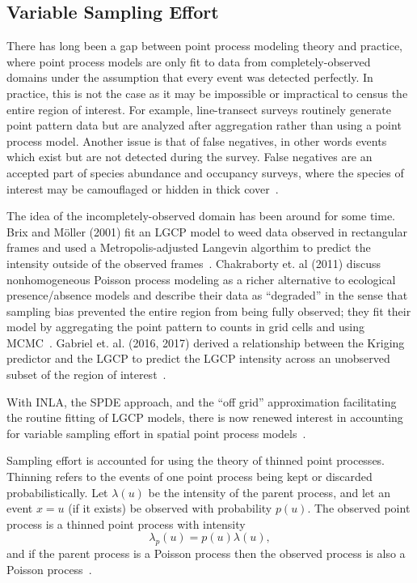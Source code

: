 \documentclass[]{interact}
\begin{document}
\subsection{Variable Sampling Effort}
\label{veffort}

There has long been a gap between point process modeling theory and practice,
where point process models are only fit to data from completely-observed
domains under the assumption that every event was detected perfectly. In
practice, this is not the case as it may be impossible or impractical to census
the entire region of interest. For example, line-transect surveys routinely
generate point pattern data but are analyzed after aggregation rather than
using a point process model. Another issue is that of false negatives, in other
words events which exist but are not detected during the survey. False
negatives are an accepted part of species abundance and occupancy surveys,
where the species of interest may be camouflaged or hidden in thick
cover~\cite{linkbarker,bucklandetal,mackenzieetal}.

The idea of the incompletely-observed domain has been around for some time.
Brix and M\"{o}ller (2001) fit an LGCP model to weed data observed in
rectangular frames and used a Metropolis-adjusted Langevin algorthim
to predict the intensity outside of the observed frames~\cite{brixmoeller}.
Chakraborty et. al (2011) discuss nonhomogeneous Poisson process modeling as
a richer alternative to ecological presence/absence models and describe their
data as ``degraded'' in the sense that sampling bias prevented the entire
region from being fully observed; they fit their model by aggregating the
point pattern to counts in grid cells and using MCMC~\cite{chakrabortyetal}.
Gabriel et. al. (2016, 2017) derived a relationship between the Kriging
predictor and the LGCP to predict the LGCP intensity across an unobserved
subset of the region of interest~\cite{gabrieletal2016, gabrieletal2017}.

With INLA, the SPDE approach, and the ``off grid'' approximation
facilitating the routine fitting of LGCP models, there is now renewed interest
in accounting for variable sampling effort in spatial point process
models~\cite{simpsonetal,yuanetal}.

Sampling effort is accounted for using the theory of thinned point processes.
Thinning refers to the events of one point process being kept or discarded
probabilistically. Let \(\lambda(u)\) be the intensity of the parent process,
and let an event \(x=u\) (if it exists) be observed with probability
\(p(u)\). The observed point process is a thinned point process with
intensity
\begin{displaymath}
\lambda_{p}(u) = p(u) \lambda(u),
\end{displaymath}
and if the parent process is a Poisson process then the observed process is
also a Poisson process~\cite{moellerbook}.
\end{document}
